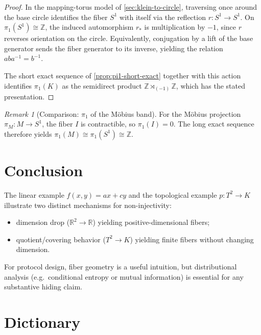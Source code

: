 \documentclass[11pt,a4paper]{article}
\theoremstyle{definition}
\theoremstyle{remark}
\newtheorem{remark}[theorem]{Remark}
\begin{document}
\begin{proof}
In the mapping-torus model of \cref{sec:klein-to-circle}, traversing once around the base circle identifies the fiber \(S^1\) with itself via the reflection \(r:S^1\to S^1\). On \(\pi_1(S^1)\cong \mathbb{Z}\), the induced automorphism \(r_*\) is multiplication by \(-1\), since \(r\) reverses orientation on the circle. Equivalently, conjugation by a lift of the base generator sends the fiber generator to its inverse, yielding the relation \(aba^{-1}=b^{-1}\).

The short exact sequence of \cref{prop:pi1-short-exact} together with this action identifies \(\pi_1(K)\) as the semidirect product \(\mathbb{Z}\rtimes_{(-1)}\mathbb{Z}\), which has the stated presentation.
\end{proof}

\begin{remark}[Comparison: \(\pi_1\) of the Möbius band]
\label{rem:pi1-mobius}
For the Möbius projection \(\pi_M:M\to S^1\), the fiber \(I\) is contractible, so \(\pi_1(I)=0\). The long exact sequence therefore yields \(\pi_1(M)\cong \pi_1(S^1)\cong \mathbb{Z}\).
\end{remark}

\section{Conclusion}
\label{sec:conclusion}

The linear example \(f(x,y)=ax+cy\) and the topological example \(p:T^2\to K\) illustrate two distinct mechanisms for non-injectivity:
\begin{itemize}
  \item dimension drop (\(\mathbb{R}^2\to\mathbb{R}\)) yielding positive-dimensional fibers;
  \item quotient/covering behavior (\(T^2\to K\)) yielding finite fibers without changing dimension.
\end{itemize}
For protocol design, fiber geometry is a useful intuition, but distributional analysis (e.g.\ conditional entropy or mutual information) is essential for any substantive hiding claim.


\appendix
\section{Dictionary}
\label{sec:dictionary}
\end{document}
